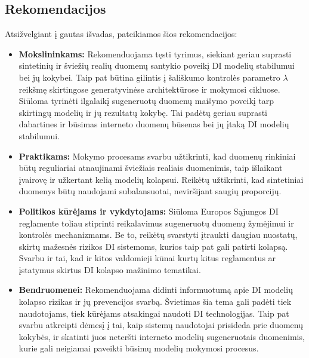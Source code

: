 \documentclass{VUMIFInfKursinis}
\begin{document}
\subsection{Rekomendacijos}

Atsižvelgiant į gautas išvadas, pateikiamos šios rekomendacijos:
\begin{itemize}
    \item \textbf{Mokslininkams:} Rekomenduojama tęsti tyrimus, siekiant geriau suprasti sintetinių ir šviežių realių duomenų santykio poveikį DI modelių stabilumui bei jų kokybei. Taip pat būtina gilintis į šališkumo kontrolės parametro \(\lambda\) reikšmę skirtingose generatyvinėse architektūrose ir mokymosi cikluose. Siūloma tyrinėti ilgalaikį sugeneruotų duomenų maišymo poveikį tarp skirtingų modelių ir jų rezultatų kokybę. Tai padėtų geriau suprasti dabartines ir būsimas interneto duomenų būsenas bei jų įtaką DI modelių stabilumui.
    \item \textbf{Praktikams:} Mokymo procesams svarbu užtikrinti, kad duomenų rinkiniai būtų reguliariai atnaujinami šviežiais realiais duomenimis, taip išlaikant įvairovę ir užkertant kelią modelių kolapsui. Reikėtų užtikrinti, kad sintetiniai duomenys būtų naudojami subalansuotai, neviršijant saugių proporcijų.
    \item \textbf{Politikos kūrėjams ir vykdytojams:} Siūloma Europos Sąjungos DI reglamente toliau stiprinti reikalavimus sugeneruotų duomenų žymėjimui ir kontrolės mechanizmams. Be to, reikėtų svarstyti įtraukti daugiau nuostatų, skirtų mažesnės rizikos DI sistemoms, kurios taip pat gali patirti kolapsą. Svarbu ir tai, kad ir kitos valdomieji kūnai kurtų kitus reglamentus ar įstatymus skirtus DI kolapso mažinimo tematikai. 
    \item \textbf{Bendruomenei:} Rekomenduojama didinti informuotumą apie DI modelių kolapso rizikas ir jų prevencijos svarbą. Švietimas šia tema gali padėti tiek naudotojams, tiek kūrėjams atsakingai naudoti DI technologijas. Taip pat svarbu atkreipti dėmesį į tai, kaip sistemų naudotojai prisideda prie duomenų kokybės, ir skatinti juos neteršti interneto modelių sugeneruotais duomenimis, kurie gali neigiamai paveikti būsimų modelių mokymosi procesus.

\end{itemize}



\printbibliography[heading=bibintoc] %
\end{document}
